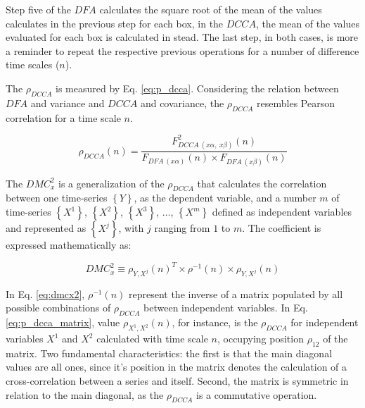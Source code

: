 \documentclass[nojss]{jss}
\begin{document}
Step five of the $DFA$ calculates the square root of the mean of the values calculates in the previous step for each box, in the $DCCA$, the mean of the values evaluated for each box is calculated in stead. The last step, in both cases, is more a reminder to repeat the respective previous operations for a number of difference time scales ($n$).

The $\rho_{DCCA}$ is measured by Eq. \ref{eq:p_dcca}. Considering the relation between $DFA$ and variance and $DCCA$ and covariance, the $\rho_{DCCA}$ resembles Pearson correlation for a time scale $n$.

\begin{equation}
  {\rho}_{DCCA}(n) = \frac{F_{DCCA~(x\alpha,~x\beta)}^{2}(n)}
  {F_{DFA~(x\alpha)}(n) \times F_{DFA~(x\beta)}(n)}
  \label{eq:p_dcca}
\end{equation}

The $DMC_x^2$ is a generalization of the $\rho_{DCCA}$ that calculates the correlation between one time-series $\left\lbrace Y \right\rbrace $, as the  dependent variable, and a number $m$ of time-series $\left\lbrace X^{1} \right\rbrace $, $\left\lbrace X^{2} \right\rbrace $, $\left\lbrace X^{3} \right\rbrace $, $\dots $, $\left\lbrace X^{m} \right\rbrace $ defined as independent variables and represented as $\left\lbrace X^{j} \right\rbrace $, with $j$ ranging from $1$ to $m$. The coefficient is expressed mathematically as:

\begin{equation}
  {DMC}_{x}^{2}  \equiv \rho_{Y,X^{j}}(n)^{T} \times \rho^{-1}(n) \times \rho_{Y,X^{j}}(n)
  \label{eq:dmcx2}
\end{equation}

In Eq. \ref{eq:dmcx2}, $\rho^{-1}(n)$ represent the inverse of a matrix populated by all possible combinations of $\rho_{DCCA}$ between independent variables. In Eq. \ref{eq:p_dcca_matrix}, value $\rho_{X^{1},X^{2}}(n)$, for instance, is the $\rho_{DCCA}$ for independent variables $X^{1}$ and $X^{2}$ calculated with time scale $n$, occupying position $\rho_{1 2}$ of the matrix. Two fundamental characteristics: the first is that the main diagonal values are all ones, since it's position in the matrix denotes the calculation of a cross-correlation between a series and itself. Second, the matrix is symmetric in relation to the main diagonal, as the $\rho_{DCCA}$ is a commutative operation.
\end{document}
